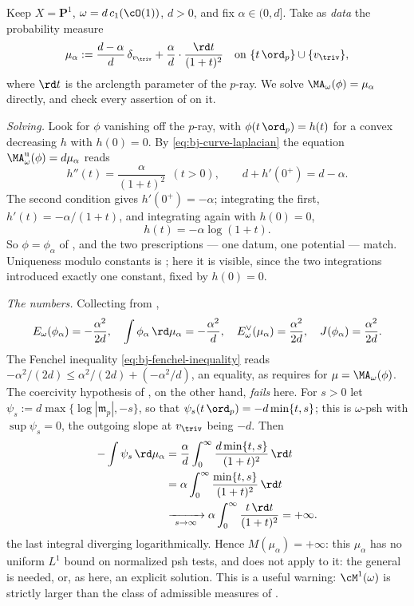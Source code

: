 \begin{example}[Solving $\MA_\omega(\phi)=\mu$ on $\mathbf P^1$ by hand]
\label{ex:ch47-explicit-potential}
Keep $X=\mathbf P^1$, $\omega=d\,c_1(\cO(1))$, $d>0$, and fix
$\alpha\in(0,d]$.  Take as \emph{data} the probability measure
\[
 \mu_\alpha:=\frac{d-\alpha}{d}\,\delta_{v_{\triv}}
 +\frac{\alpha}{d}\cdot\frac{\rd t}{(1+t)^2}
 \quad\text{on }\{t\,\ord_p\}\cup\{v_{\triv}\},
\]
where $\rd t$ is the arclength parameter of the $p$-ray.  We solve
$\MA_\omega(\phi)=\mu_\alpha$ directly, and check every assertion of
 on it.

\emph{Solving.}  Look for $\phi$ vanishing off the $p$-ray, with
$\phi(t\,\ord_p)=h(t)$ for a convex decreasing $h$ with $h(0)=0$.  By
\eqref{eq:bj-curve-laplacian} the equation
$\MA^{\mathrm u}_\omega(\phi)=d\mu_\alpha$ reads
\[
 h''(t)=\frac{\alpha}{(1+t)^2}\ \ (t>0),
 \qquad
 d+h'(0^+)=d-\alpha .
\]
The second condition gives $h'(0^+)=-\alpha$; integrating the first,
$h'(t)=-\alpha/(1+t)$, and integrating again with $h(0)=0$,
\[
 h(t)=-\alpha\log(1+t).
\]
So $\phi=\phi_\alpha$ of , and the two
prescriptions --- one datum, one potential --- match.  Uniqueness modulo
constants is ; here it is visible, since the two
integrations introduced exactly one constant, fixed by $h(0)=0$.

\emph{The numbers.}  Collecting from ,
\[
 E_\omega(\phi_\alpha)=-\frac{\alpha^2}{2d},
 \quad
 \int\phi_\alpha\,\rd\mu_\alpha=-\frac{\alpha^2}{d},
 \quad
 E^\vee_\omega(\mu_\alpha)=\frac{\alpha^2}{2d},
 \quad
 J(\phi_\alpha)=\frac{\alpha^2}{2d}.
\]
The Fenchel inequality \eqref{eq:bj-fenchel-inequality} reads
$-\alpha^2/(2d)\le\alpha^2/(2d)+(-\alpha^2/d)$, an equality, as
 requires for
$\mu=\MA_\omega(\phi)$.  The coercivity hypothesis of
, on the other hand, \emph{fails} here.  For
$s>0$ let $\psi_s:=d\max\{\log|\mathfrak m_p|,-s\}$, so that
$\psi_s(t\,\ord_p)=-d\min\{t,s\}$; this is $\omega$-psh with
$\sup\psi_s=0$, the outgoing slope at $v_{\triv}$ being $-d$.  Then
\[
 \begin{aligned}
 -\int\psi_s\,\rd\mu_\alpha
 &=\frac{\alpha}{d}
   \int_0^\infty\frac{d\min\{t,s\}}{(1+t)^2}\,\rd t\\
 &=\alpha\int_0^\infty
   \frac{\min\{t,s\}}{(1+t)^2}\,\rd t\\
 &\xrightarrow[\ s\to\infty\ ]{}
   \alpha\int_0^\infty\frac{t\,\rd t}{(1+t)^2}
   =+\infty .
 \end{aligned}
\]
the last integral diverging logarithmically.  Hence
$M(\mu_\alpha)=+\infty$: this $\mu_\alpha$ has no uniform
$L^1$ bound on normalized psh tests, and
 does not apply to it: the general
 is needed, or, as here, an explicit solution.
This is a useful warning: $\cM^1(\omega)$ is strictly larger than the
class of admissible measures of .


\end{example}

